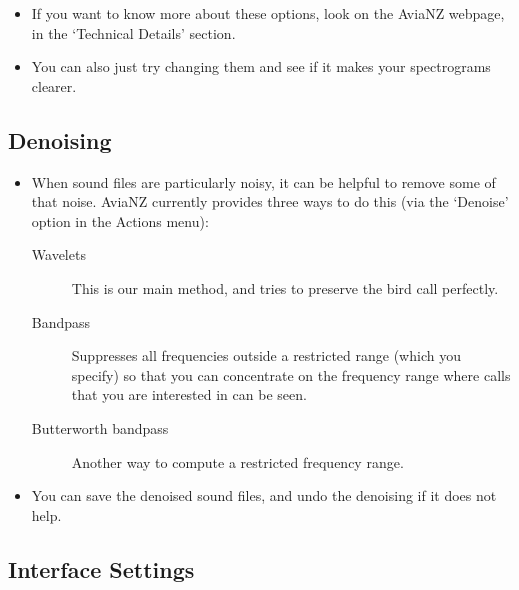 \documentclass{article}
\begin{document}
\begin{itemize}
\item If you want to know more about these options, look on the AviaNZ webpage, in the `Technical Details' section. 
\item You can also just try changing them and see if it makes your spectrograms clearer.
\end{itemize}

\subsection{Denoising}\label{sec:denoising}

\begin{itemize}
\item When sound files are particularly noisy, it can be helpful to remove some of that noise. AviaNZ currently provides three ways to do this (via the `Denoise' option in the Actions menu):
\begin{description}
\item[Wavelets] This is our main method, and tries to preserve the bird call perfectly. 
\item[Bandpass] Suppresses all frequencies outside a restricted range (which you specify) so that you can concentrate on the frequency range where calls that you are interested in can be seen.
\item[Butterworth bandpass] Another way to compute a restricted frequency range.
\end{description}
\item You can save the denoised sound files, and undo the denoising if it does not help.
\end{itemize}

\subsection{Interface Settings}\label{sec:interfacesettings}
\end{document}
